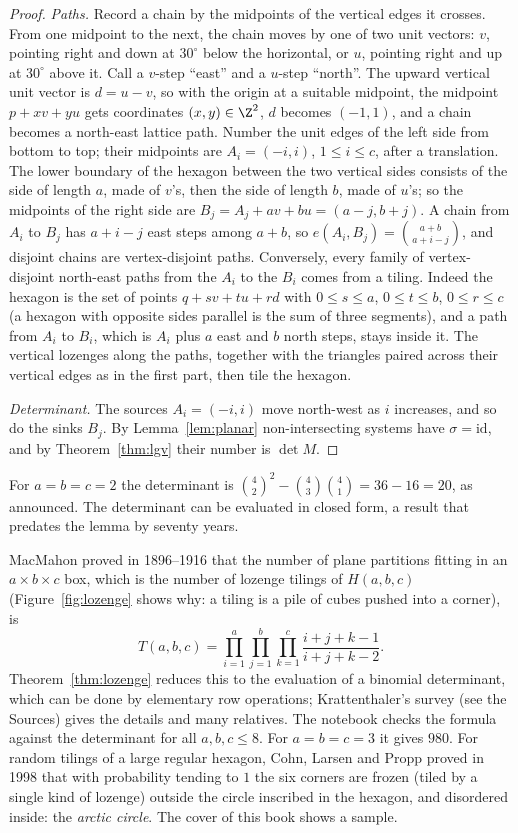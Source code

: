 \begin{proof}
\emph{Paths.} Record a chain by the midpoints of the vertical edges it crosses. From one midpoint to the next, the chain
moves by one of two unit vectors: $v$, pointing right and down at $30^\circ$ below the horizontal, or $u$, pointing right
and up at $30^\circ$ above it. Call a $v$-step ``east'' and a $u$-step ``north''. The upward vertical unit vector is
$d=u-v$, so with the origin at a suitable midpoint, the midpoint $p+xv+yu$ gets coordinates $(x,y)\in\Z^2$, $d$ becomes
$(-1,1)$, and a chain becomes a north-east lattice path. Number the unit edges of the left side from bottom to top; their
midpoints are $A_i=(-i,i)$, $1\le i\le c$, after a translation. The lower boundary of the hexagon between the two
vertical sides consists of the side of length $a$, made of $v$'s, then the side of length $b$, made of $u$'s; so the
midpoints of the right side are $B_j=A_j+av+bu=(a-j,b+j)$. A chain from $A_i$ to $B_j$ has $a+i-j$ east steps among
$a+b$, so $e(A_i,B_j)=\binom{a+b}{a+i-j}$, and disjoint chains are vertex-disjoint paths. Conversely, every family of
vertex-disjoint north-east paths from the $A_i$ to the $B_i$ comes from a tiling. Indeed the hexagon is the set of points
$q+sv+tu+rd$ with $0\le s\le a$, $0\le t\le b$, $0\le r\le c$ (a hexagon with opposite sides parallel is the sum of three
segments), and a path from $A_i$ to $B_i$, which is $A_i$ plus $a$ east and $b$ north steps, stays inside it. The
vertical lozenges along the paths, together with the triangles paired across their vertical edges as in the first part,
then tile the hexagon.

\emph{Determinant.} The sources $A_i=(-i,i)$ move north-west as $i$ increases, and so do the sinks $B_j$. By
Lemma~\ref{lem:planar} non-intersecting systems have $\sigma=\mathrm{id}$, and by Theorem~\ref{thm:lgv} their number is
$\det M$.
\end{proof}

For $a=b=c=2$ the determinant is $\binom42^2-\binom43\binom41=36-16=20$, as announced. The determinant can be evaluated in
closed form, a result that predates the lemma by seventy years.

\begin{remark}
MacMahon proved in 1896--1916 that the number of plane partitions fitting in an $a\times b\times c$ box, which is the
number of lozenge tilings of $H(a,b,c)$ (Figure~\ref{fig:lozenge} shows why: a tiling is a pile of cubes pushed into a
corner), is
\[
T(a,b,c)=\prod_{i=1}^a\prod_{j=1}^b\prod_{k=1}^c\frac{i+j+k-1}{i+j+k-2}.
\]
Theorem~\ref{thm:lozenge} reduces this to the evaluation of a binomial determinant, which can be done by elementary row
operations; Krattenthaler's survey (see the Sources) gives the details and many relatives. The notebook checks the
formula against the determinant for all $a,b,c\le8$. For $a=b=c=3$ it gives $980$. For random tilings of a large regular
hexagon, Cohn, Larsen and Propp proved in 1998 that with probability tending to $1$ the six corners are frozen (tiled by
a single kind of lozenge) outside the circle inscribed in the hexagon, and disordered inside: the \emph{arctic circle}.
The cover of this book shows a sample.
\end{remark}

